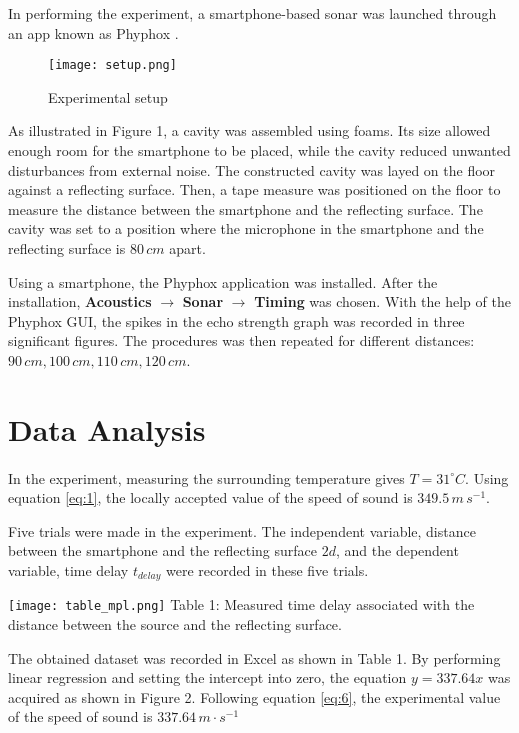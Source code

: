 \documentclass{article}
\begin{document}
\begin{multicols}{2}
In performing the experiment, a smartphone-based sonar was launched through an app known as Phyphox \cite{phyphox}.

\begin{wrapfigure}{r}{4.5cm}
  \centering
    \texttt{[image: setup.png]}
  \caption{Experimental setup}
\end{wrapfigure}

As illustrated in Figure 1, a cavity was assembled using foams. Its size allowed enough room for the smartphone to be placed, while the cavity reduced unwanted disturbances from external noise. The constructed cavity was layed on the floor against a reflecting surface. Then, a tape measure was positioned on the floor to measure the distance between the smartphone and the reflecting surface. The cavity was set to a position where the microphone in the smartphone and the reflecting surface is $80 \, cm$ apart.

Using a smartphone, the Phyphox application was installed. After the installation, \textbf{Acoustics} $\rightarrow$ \textbf{Sonar} $\rightarrow$ \textbf{Timing} was chosen. With the help of the Phyphox GUI, the spikes in the echo strength graph was recorded in three significant figures. The procedures was then repeated for different distances: $90 \, cm, 100 \, cm, 110 \, cm, 120 \, cm$. 

\section{Data Analysis}
\paragraph{}

In the experiment, measuring the surrounding temperature gives $T = 31^{\circ}C$. Using equation \eqref{eq:1}, the locally accepted value of the speed of sound is $349.5 \, m \, s^{-1}$.

Five trials were made in the experiment. The independent variable, distance between the smartphone and the reflecting surface $2d$, and the dependent variable, time delay $t_{delay}$ were recorded in these five trials. 


\begin{center}
\texttt{[image: table\_mpl.png]} 
Table 1: Measured time delay associated with the distance between the source and the reflecting surface.
\end{center}

The obtained dataset was recorded in Excel as shown in Table 1. By performing linear regression and setting the intercept into zero, the equation $y=337.64x$ was acquired as shown in Figure 2. Following equation \eqref{eq:6}, the experimental value of the speed of sound is  $337.64 \, m \cdot s^{-1}$ 


\end{multicols}
\end{document}

